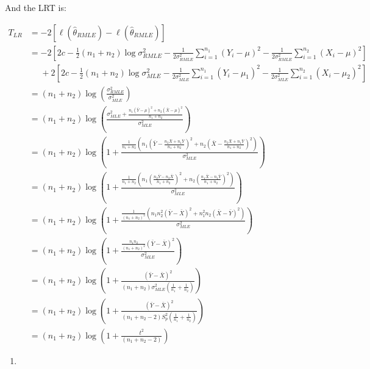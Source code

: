 \documentclass[
  letterpaper,
  DIV=11,
  numbers=noendperiod]{scrreprt}
\providecommand{\tightlist}{%
  \setlength{\itemsep}{0pt}\setlength{\parskip}{0pt}}\usepackage{longtable,booktabs,array}
\begin{document}
\newpage

And the LRT is:

\[\begin{aligned}T_{LR} &= -2 [\ell (\hat \theta_{RMLE}) - \ell(\hat \theta_{RMLE})] \\
&=-2 [2c- \frac 1 2 (n_1+n_2)\log \sigma_{RMLE}^2 - \frac 1 {2\sigma_{RMLE}^2} \sum_{i=1}^{n_1}(Y_i-\mu)^2 - \frac 1 {2\sigma_{RMLE}^2} \sum_{i=1}^{n_2}(X_i-\mu)^2] \\
&~~~~~~+2 [2c-\frac 1 2 (n_1+n_2)\log \sigma_{MLE}^2 - \frac 1 {2\sigma_{MLE}^2} \sum_{i=1}^{n_1}(Y_i-\mu_1)^2 - \frac 1 {2\sigma_{MLE}^2} \sum_{i=1}^{n_2}(X_i-\mu_2)^2] \\
&=(n_1+n_2) \log \left(\frac{\sigma_{RMLE}^2}{\sigma_{MLE}^2} \right)\\
&= (n_1+n_2) \log \left(\frac{\sigma^2_{MLE}+\frac{n_1(\bar Y- \mu)^2+n_2(\bar X- \mu)^2  }{n_1+n_2}}{\sigma_{MLE}^2} \right)\\
&= (n_1+n_2) \log \left(1+\frac{\frac 1{n_1+n_2}\left(n_1(\bar Y- \frac{n_2 \bar X + n_1 \bar Y}{n_1+n_2})^2+n_2(\bar X- \frac{n_2 \bar X + n_1 \bar Y}{n_1+n_2})^2  \right)}
{\sigma^2_{MLE}} \right)\\
&= (n_1+n_2) \log \left(1+\frac{\frac 1{n_1+n_2}\left(n_1(\frac{n_2 \bar Y- n_2 \bar X}{n_1+n_2})^2+n_2(\frac{n_1 \bar X - n_1 \bar Y}{n_1+n_2})^2  \right)}{\sigma_{MLE}^2 } \right)\\
&= (n_1+n_2) \log \left(1+\frac{\frac 1{(n_1+n_2)^3}\left(n_1n_2^2( \bar Y- \bar X)^2+n_1^2n_2(\bar X - \bar Y)^2  \right)}{\sigma_{MLE}^2 } \right)\\
&= (n_1+n_2) \log \left(1+\frac{\frac{n_1n_2}{(n_1 + n_2)^2} \left(\bar Y - \bar X\right)^2}
{\sigma_{MLE}^2 } \right)\\
&= (n_1+n_2) \log \left(1+\frac{ \left(\bar Y - \bar X\right)^2}
{(n_1+n_2)\sigma_{MLE}^2 \left(\frac 1{n_1} + \frac 1 {n_2}\right)} \right)\\
&= (n_1+n_2) \log \left(1+\frac{ \left(\bar Y - \bar X\right)^2}
{(n_1+n_2-2)S_p^2 \left(\frac 1{n_1} + \frac 1 {n_2}\right)} \right)\\
&= (n_1+n_2) \log \left(1+\frac{t^2}{(n_1+n_2-2)} \right)
\end{aligned}
\]

\newpage

\begin{enumerate}
\def\labelenumi{\alph{enumi}.}
\setcounter{enumi}{1}
\tightlist
\item
\end{enumerate}
\end{document}

